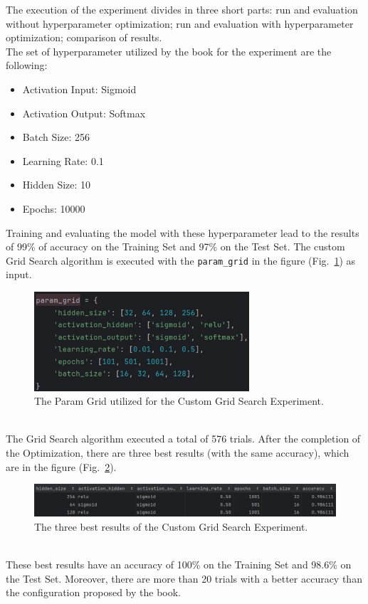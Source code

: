 The execution of the experiment divides in three short parts: run and evaluation without hyperparameter optimization; run and evaluation with hyperparameter optimization; comparison of results.
\\[0.3cm]The set of hyperparameter utilized by the book for the experiment are the following:
\begin{itemize}[itemsep=0.1cm]
    \item Activation Input: Sigmoid
    \item Activation Output: Softmax
    \item Batch Size: 256
    \item Learning Rate: 0.1
    \item Hidden Size: 10
    \item Epochs: 10000
\end{itemize}
Training and evaluating the model with these hyperparameter lead to the results of 99\% of accuracy on the Training Set and 97\% on the Test Set.
The custom Grid Search algorithm is executed with the \texttt{param\_grid} in the figure (Fig.~\ref{fig:figure-4.1.1}) as input.
\begin{figure}[t]
	\centering
	\includegraphics[width=8cm]{figures/figure-4.1.1.png}
	\caption[Param Grid for Custom Grid Search Experiment]{The Param Grid utilized for the Custom Grid Search Experiment.}
	\label{fig:figure-4.1.1}
\end{figure}
\\[0.3cm]The Grid Search algorithm executed a total of 576 trials. After the completion of the Optimization, there are three best results (with the same accuracy), which are in the figure (Fig.~\ref{fig:figure-4.1.2}).
\begin{figure}[t]
	\centering
	\includegraphics[width=15cm]{figures/figure-4.1.2.png}
	\caption[Best Results of Custom Grid Search Experiment]{The three best results of the Custom Grid Search Experiment.}
	\label{fig:figure-4.1.2}
\end{figure}
\\[0.3cm]These best results have an accuracy of 100\% on the Training Set and 98.6\% on the Test Set. Moreover, there are more than 20 trials with a better accuracy than the configuration proposed by the book.


